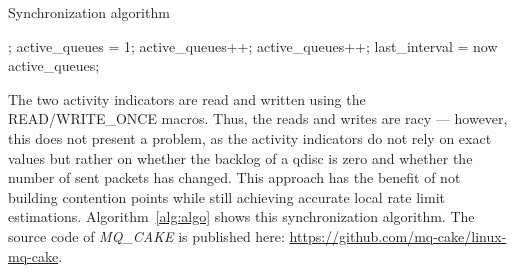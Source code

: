 \begin{algorithm}[t]
    \caption{Synchronization algorithm}\label{alg:algo}
\begin{algorithmic}[1]
    \State {};
\EndIf
\State active\_queues = 1;
    \State active\_queues++;
    \State active\_queues++;
    \EndIf
\EndFor
\State last\_interval = now
\State \Return active\_queues;
\EndProcedure
\end{algorithmic}
\end{algorithm}
The two activity indicators are read and written using the READ/WRITE\_ONCE macros.
%
Thus, the reads and writes are racy --- however, this does not present a problem, as the activity indicators do not rely on exact values but rather on whether the backlog of a qdisc is zero and whether the number of sent packets has changed.
%
This approach has the benefit of not building contention points while still achieving accurate local rate limit estimations.
%
Algorithm~\ref{alg:algo} shows this synchronization algorithm.
%
The source code of \textit{MQ\_CAKE} is published here: \url{https://github.com/mq-cake/linux-mq-cake}.

